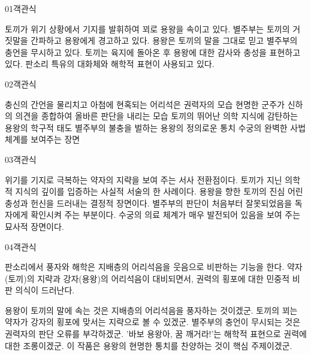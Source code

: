 \documentclass[fs85,seriesWit]{korfarm-base}
\begin{document}
\kfBeginMC
\begin{kfQBlock}{01}{객관식}
\begin{kfChoices}
\kfChoice 토끼가 위기 상황에서 기지를 발휘하여 꾀로 용왕을 속이고 있다.
\kfChoice 별주부는 토끼의 거짓말을 간파하고 용왕에게 경고하고 있다.
\kfChoice 용왕은 토끼의 말을 그대로 믿고 별주부의 충언을 무시하고 있다.
\kfChoice 토끼는 육지에 돌아온 후 용왕에 대한 감사와 충성을 표현하고 있다.
\kfChoice 판소리 특유의 대화체와 해학적 표현이 사용되고 있다.
\end{kfChoices}
\end{kfQBlock}

\begin{kfQBlock}{02}{객관식}
\begin{kfChoices}
\kfChoice 충신의 간언을 물리치고 아첨에 현혹되는 어리석은 권력자의 모습
\kfChoice 현명한 군주가 신하의 의견을 종합하여 올바른 판단을 내리는 모습
\kfChoice 토끼의 뛰어난 의학 지식에 감탄하는 용왕의 학구적 태도
\kfChoice 별주부의 불충을 벌하는 용왕의 정의로운 통치
\kfChoice 수궁의 완벽한 사법 체계를 보여주는 장면
\end{kfChoices}
\end{kfQBlock}

\begin{kfQBlock}{03}{객관식}
\begin{kfChoices}
\kfChoice 위기를 기지로 극복하는 약자의 지략을 보여 주는 서사 전환점이다.
\kfChoice 토끼가 지닌 의학적 지식의 깊이를 입증하는 사실적 서술의 한 사례이다.
\kfChoice 용왕을 향한 토끼의 진심 어린 충성과 헌신을 드러내는 결정적 장면이다.
\kfChoice 별주부의 판단이 처음부터 잘못되었음을 독자에게 확인시켜 주는 부분이다.
\kfChoice 수궁의 의료 체계가 매우 발전되어 있음을 보여 주는 묘사적 장면이다.
\end{kfChoices}
\end{kfQBlock}

\begin{kfQBlock}{04}{객관식}
\begin{kfEvidence}판소리에서 풍자와 해학은 지배층의 어리석음을 웃음으로 비판하는 기능을 한다. 약자(토끼)의 지략과 강자(용왕)의 어리석음이 대비되면서, 권력의 횡포에 대한 민중적 비판 의식이 드러난다.\end{kfEvidence}
\begin{kfChoices}
\kfChoice 용왕이 토끼의 말에 속는 것은 지배층의 어리석음을 풍자하는 것이겠군.
\kfChoice 토끼의 꾀는 약자가 강자의 횡포에 맞서는 지략으로 볼 수 있겠군.
\kfChoice 별주부의 충언이 무시되는 것은 권력자의 판단 오류를 부각하겠군.
\kfChoice '바보 용왕아, 꿈 깨거라!'는 해학적 표현으로 권력에 대한 조롱이겠군.
\kfChoice 이 작품은 용왕의 현명한 통치를 찬양하는 것이 핵심 주제이겠군.
\end{kfChoices}
\end{kfQBlock}
\end{document}
